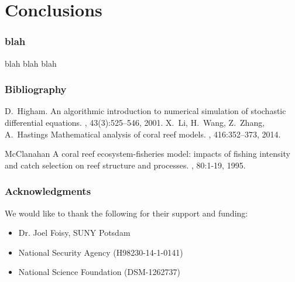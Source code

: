 
\section{Conclusions}


\begin{frame}
  \frametitle{blah}

  blah blah blah

\end{frame}

 
\begin{frame}
  \frametitle{Bibliography}

 \begin{thebibliography}{1}

   D.~Higham.
   \newblock An algorithmic introduction to numerical simulation of stochastic
   differential equations.
   , 43(3):525--546, 2001.
   X.~Li, H.~Wang, Z.~Zhang, A.~Hastings
   \newblock Mathematical analysis of coral reef models.
   , 416:352--373, 2014.

    McClanahan
    \newblock A coral reef ecosystem-fisheries model: impacts of fishing intensity and catch selection on reef structure and processes.
    , 80:1-19, 1995.

  \end{thebibliography}
  
\end{frame}

\begin{frame}
  \frametitle{Acknowledgments}
  
  We would like to thank the following for their support and funding: 
  
 \begin{itemize}
 \item Dr. Joel Foisy, SUNY Potsdam
 \item National Security Agency (H98230-14-1-0141)
 \item National Science Foundation (DSM-1262737)
 \end{itemize}
\end{frame}



